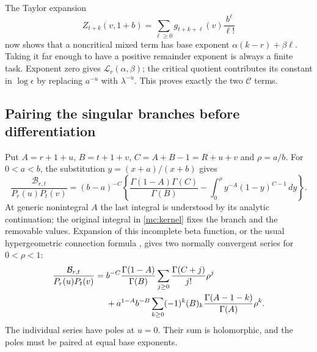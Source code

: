 The Taylor expansion
\[
 Z_{t+k}(v,1+b)=\sum_{\ell\ge0}
                       g_{t+k+\ell}(v)\frac{b^\ell}{\ell!}
\]
now shows that a noncritical mixed term has base exponent
$\alpha(k-r)+\beta\ell$. Taking it far enough to have a positive
remainder exponent is always a finite task. Exponent zero gives
$\mathscr L_r(\alpha,\beta)$; the critical quotient contributes
its constant in $\log\epsilon$ by replacing $a^{-u}$ with
$\lambda^{-u}$. This proves exactly the two $\mathcal C$ terms.

\subsection{Pairing the singular branches before differentiation}

Put $A=r+1+u$, $B=t+1+v$, $C=A+B-1=R+u+v$ and
$\rho=a/b$. For $0<a<b$, the substitution
$y=(x+a)/(x+b)$ gives
\begin{equation}\label{mc:incomplete-beta}
 \frac{\mathcal B_{r,t}}{P_r(u)P_t(v)}
  =(b-a)^{-C}\left\{
     \frac{\Gamma(1-A)\Gamma(C)}{\Gamma(B)}
      -\int_0^\rho y^{-A}(1-y)^{C-1}\,dy\right\}.
\end{equation}
At generic nonintegral $A$ the last integral is understood by its
analytic continuation; the original integral in
\eqref{mc:kernel} fixes the branch and the removable values.
Expansion of this incomplete beta function, or the usual
hypergeometric connection formula \cite[\S15.8]{DLMF}, gives
two normally convergent series for $0<\rho<1$:
\begin{align}\label{mc:two-branches}
 \frac{\mathcal B_{r,t}}{P_r(u)P_t(v)}
 ={}&b^{-C}\frac{\Gamma(1-A)}{\Gamma(B)}
             \sum_{j\ge0}\frac{\Gamma(C+j)}{j!}\rho^j\notag\\
 &+a^{1-A}b^{-B}
      \sum_{k\ge0}(-1)^k(B)_k
                         \frac{\Gamma(A-1-k)}{\Gamma(A)}\rho^k.
\end{align}
The individual series have poles at $u=0$. Their sum is
holomorphic, and the poles must be paired at equal base exponents.

